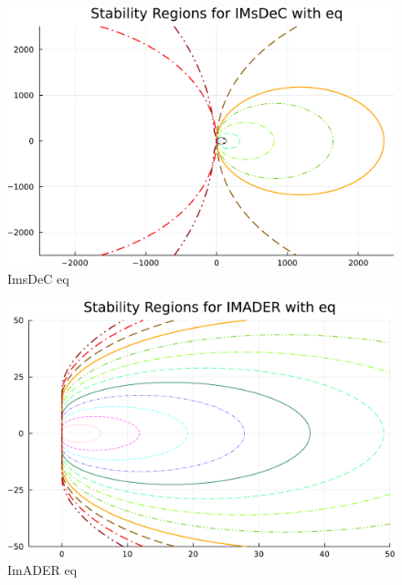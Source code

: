 \begin{figure}
\begin{minipage}[t]{0.32\textwidth}
	\includegraphics[width=\textwidth, trim={0 0 0 22}, clip]{pdf/odepics/IMsDeC_eq_ord13-crop.pdf}\\
	ImsDeC eq
	\end{minipage}
	\begin{minipage}[t]{0.32\textwidth}
		\centering
		\includegraphics[width=\textwidth, trim={0 0 0 22}, clip]{pdf/odepics/IMADER_eq_ord13-crop.pdf}\\
		ImADER eq
	\end{minipage}\\
	\begin{minipage}[t]{0.32\textwidth}
		\centering

\end{minipage}
\end{figure}
